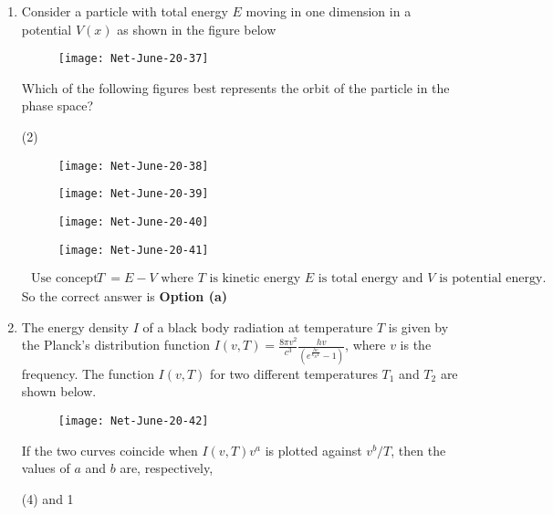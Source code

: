 \begin{enumerate}
\begin{answer}
\end{answer}
\item Consider a particle with total energy $E$ moving in one dimension in a potential $V(x)$ as shown in the figure below
\begin{figure}[H]
	\centering
	\texttt{[image: Net-June-20-37]}
\end{figure}
Which of the following figures best represents the orbit of the particle in the phase space?
	 \begin{tasks}(2)
		\task[\textbf{a.}]
		\begin{figure}[H]
			\centering
			\texttt{[image: Net-June-20-38]}
		\end{figure}
		\task[\textbf{b.}]
		\begin{figure}[H]
			\centering
			\texttt{[image: Net-June-20-39]}
		\end{figure}
		\task[\textbf{c.}]
		\begin{figure}[H]
			\centering
			\texttt{[image: Net-June-20-40]}
		\end{figure}
		\task[\textbf{d.}] 
		\begin{figure}[H]
			\centering
			\texttt{[image: Net-June-20-41]}
		\end{figure}
	\end{tasks}
\begin{answer}
	\begin{align*}
	\text { Use concept } T&=E-V \text { where } T \text { is kinetic energy } E \text { is total energy and } V \text { is potential energy. }
	\end{align*}
	So the correct answer is \textbf{Option (a)}
\end{answer}
\item The energy density $I$ of a black body radiation at temperature $T$ is given by the Planck's distribution function $I(v, T)=\frac{8 \pi v^{2}}{c^{3}} \frac{h v}{\left(e^{\frac{h v}{k_{B} T}}-1\right)}$, where $v$ is the frequency. The function $I(v, T)$ for two different temperatures $T_{1}$ and $T_{2}$ are shown below.
\begin{figure}[H]
	\centering
	\texttt{[image: Net-June-20-42]}
\end{figure}
 If the two curves coincide when $I(v, T) v^{a}$ is plotted against $v^{b} / T$, then the values of $a$ and $b$ are, respectively,
 \begin{tasks}(4)
	 and 1

\end{tasks}
\end{enumerate}
